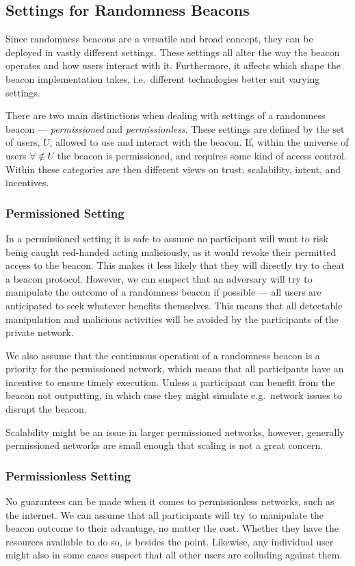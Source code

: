 \subsection{Settings for Randomness Beacons}
Since randomness beacons are a versatile and broad concept, they can be deployed in vastly different settings.
These settings all alter the way the beacon operates and how users interact with it.
Furthermore, it affects which shape the beacon implementation takes, i.e.\ different technologies better suit varying settings.

There are two main distinctions when dealing with settings of a randomness beacon --- \emph{permissioned} and \emph{permissionless}. These settings are defined by the set of users, $U$, allowed to use and interact with the beacon. If, within the universe of users $\forall\notin U$ the beacon is permissioned, and requires some kind of access control.
Within these categories are then different views on trust, scalability, intent, and incentives.

\subsubsection{Permissioned Setting}
In a permissioned setting it is safe to assume no participant will want to risk being caught red-handed acting maliciously, as it would revoke their permitted access to the beacon. This makes it less likely that they will directly try to cheat a beacon protocol.
However, we can suspect that an adversary will try to manipulate the outcome of a randomness beacon if possible --- all users are anticipated to seek whatever benefits themselves.
This means that all detectable manipulation and malicious activities will be avoided by the participants of the private network.

We also assume that the continuous operation of a randomness beacon is a priority for the permissioned network, which means that all participants have an incentive to ensure timely execution.
Unless a participant can benefit from the beacon not outputting, in which case they might simulate e.g.\ network issues to disrupt the beacon.

Scalability might be an issue in larger permissioned networks, however, generally permissioned networks are small enough that scaling is not a great concern.

\subsubsection{Permissionless Setting}
No guarantees can be made when it comes to permissionless networks, such as the internet.
We can assume that all participants will try to manipulate the beacon outcome to their advantage, no matter the cost.
Whether they have the resources available to do so, is besides the point.
Likewise, any individual user might also in some cases suspect that all other users are colluding against them.

